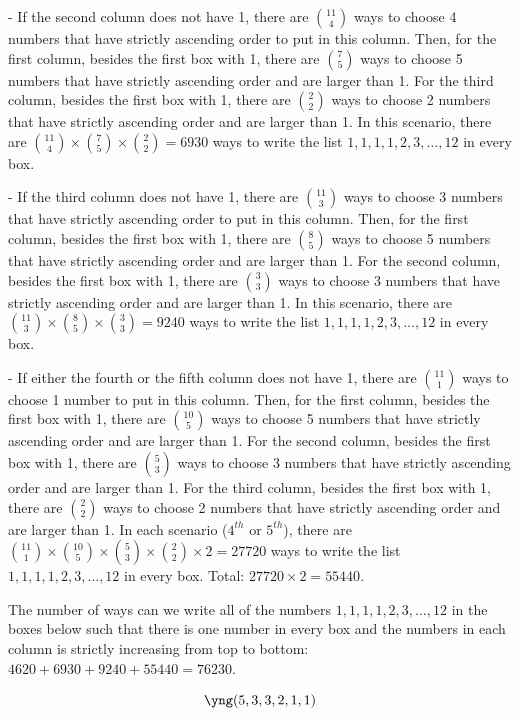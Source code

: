 \documentclass[10pt]{article}
\begin{document}
\begin{enumerate}
\begin{enumerate}
- If the second column does not have 1, there are $\binom{11}{4}$ ways to choose 4 numbers that have strictly ascending order to put in this column. Then, for the first column, besides the first box with 1, there are $\binom{7}{5}$ ways to choose 5 numbers that have strictly ascending order and are larger than 1. For the third column, besides the first box with 1, there are $\binom{2}{2}$ ways to choose 2 numbers that have strictly ascending order and are larger than 1. In this scenario, there are $\binom{11}{4} \times \binom{7}{5} \times \binom{2}{2} = 6930$ ways to write the list $1,1,1,1,2,3,\ldots,12$ in every box.

- If the third column does not have 1, there are $\binom{11}{3}$ ways to choose 3 numbers that have strictly ascending order to put in this column. Then, for the first column, besides the first box with 1, there are $\binom{8}{5}$ ways to choose 5 numbers that have strictly ascending order and are larger than 1. For the second column, besides the first box with 1, there are $\binom{3}{3}$ ways to choose 3 numbers that have strictly ascending order and are larger than 1. In this scenario, there are $\binom{11}{3} \times \binom{8}{5} \times \binom{3}{3} = 9240$ ways to write the list $1,1,1,1,2,3,\ldots,12$ in every box.

- If either the fourth or the fifth column does not have 1, there are $\binom{11}{1}$ ways to choose 1 number to put in this column. Then, for the first column, besides the first box with 1, there are $\binom{10}{5}$ ways to choose 5 numbers that have strictly ascending order and are larger than 1. For the second column, besides the first box with 1, there are $\binom{5}{3}$ ways to choose 3 numbers that have strictly ascending order and are larger than 1.  For the third column, besides the first box with 1, there are $\binom{2}{2}$ ways to choose 2 numbers that have strictly ascending order and are larger than 1. In each scenario ($4^{th}$ or $5^{th}$), there are $\binom{11}{1} \times \binom{10}{5} \times \binom{5}{3} \times \binom{2}{2} \times 2 = 27720$ ways to write the list $1,1,1,1,2,3,\ldots,12$ in every box. Total: $27720 \times 2 = 55440$.

The number of ways can we write all of the numbers $1,1,1,1,2,3,\ldots,12$ in the boxes
below such that there is one number in every box and the numbers in each
column is strictly increasing from top to bottom: $4620 + 6930 + 9240 + 55440= 76230$.


\Huge$$
\yng(5,3,3,2,1,1)
$$

\normalsize


\end{enumerate}
\end{enumerate}
\end{document}
